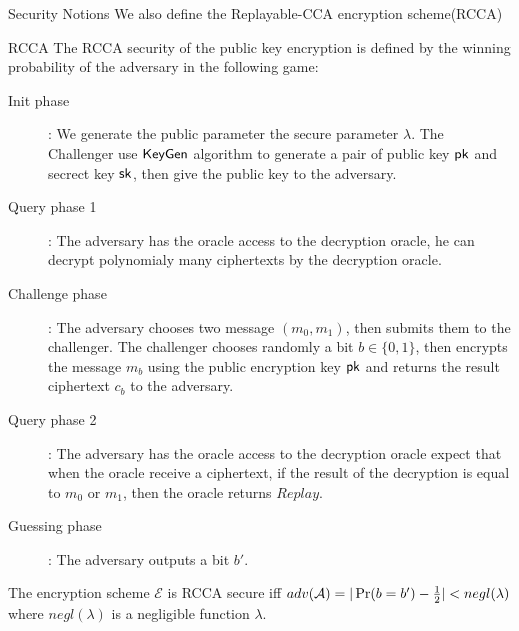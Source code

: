 \begin{subsection}{Security Notions}
  We also define the Replayable-CCA encryption scheme(RCCA)
  \begin{myDef}{RCCA}
    The RCCA security of the public key encryption is defined by the winning probability of the adversary in the following game:
    \begin{description}
    \item[Init phase]:
      We generate the public parameter \wrt the secure parameter $\lambda$. The Challenger use ${\mathsf{KeyGen}}$ algorithm to generate a pair of public key $\mathsf{pk}$ and secrect key $\mathsf{sk}$, then give the public key to the adversary.
    \item[Query phase 1]: The adversary has the oracle access to the decryption oracle, he can decrypt polynomialy many ciphertexts by the decryption oracle.
    \item[Challenge phase]: The adversary chooses two message $(m_0, m_1)$, then submits them to the challenger. The challenger chooses randomly a bit $b \in \{0,1\}$, then encrypts the message $m_b$ using the public encryption key $\mathsf{pk}$ and returns the result ciphertext $c_b$ to the adversary.
    \item[Query phase 2]: The adversary has the oracle access to the decryption oracle expect that when the oracle receive a ciphertext, if the result of the decryption is equal to $m_0$ or $m_1$, then the oracle returns $Replay$.
    \item[Guessing phase]: The adversary outputs a bit $b'$.
  \end{description}

  The encryption scheme $\mathcal{E}$ is RCCA secure iff $adv(\mathcal{A}) = |\operatorname{Pr}(b = b') - \frac{1}{2}| < negl(\lambda)$ where $negl(\lambda)$ is a negligible function \wrt $\lambda$.
  \end{myDef}


\end{subsection}
